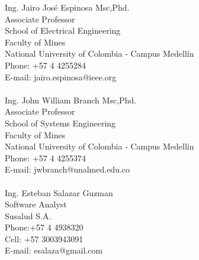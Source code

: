 \begin{resume}
Ing. Jairo Jos\'{e} Espinosa Msc,Phd.\\
Associate Professor \\
School of Electrical Engineering \\
Faculty of Mines \\
National University of Colombia - Campus Medell\'{i}n\\
Phone: +57 4 4255284 \\
E-mail: jairo.espinosa@ieee.org\\
\\  
Ing. John William Branch Msc,Phd.\\
Associate Professor \\
School of Systems Engineering \\
Faculty of Mines \\
National University of Colombia - Campus Medell\'{i}n\\
Phone: +57 4 4255374 \\
E-mail: jwbranch@unalmed.edu.co\\
\\  
Ing. Esteban Salazar Guzman\\
Software Analyst \\
Susalud S.A. \\
Phone:+57  4 4938320 \\
Cell: +57 3003943091 \\
E-mail: esalaza@gmail.com\\
\\  



\end{resume}

